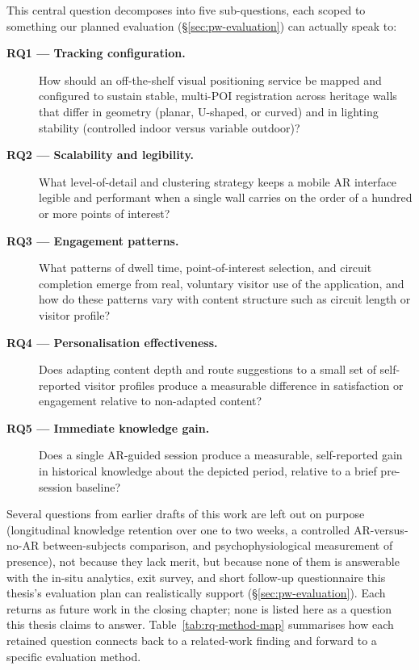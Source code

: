This central question decomposes into five sub-questions, each scoped to
something our planned evaluation (\S\ref{sec:pw-evaluation}) can actually
speak to:
 
\begin{description}
  \item[\textbf{RQ1 --- Tracking configuration.} ] How should an
  off-the-shelf visual positioning service be mapped and configured to
  sustain stable, multi-POI registration across heritage walls that differ
  in geometry (planar, U-shaped, or curved) and in lighting stability
  (controlled indoor versus variable outdoor)?
 
  \item[\textbf{RQ2 --- Scalability and legibility.}] What level-of-detail
  and clustering strategy keeps a mobile AR interface legible and
  performant when a single wall carries on the order of a hundred or more
  points of interest?
 
  \item[\textbf{RQ3 --- Engagement patterns.}] What patterns of dwell time,
  point-of-interest selection, and circuit completion emerge from real,
  voluntary visitor use of the application, and how do these patterns vary
  with content structure such as circuit length or visitor profile?
 
  \item[\textbf{RQ4 --- Personalisation effectiveness.}] Does adapting
  content depth and route suggestions to a small set of self-reported
  visitor profiles produce a measurable difference in satisfaction or
  engagement relative to non-adapted content?
 
  \item[\textbf{RQ5 --- Immediate knowledge gain.}] Does a single AR-guided
  session produce a measurable, self-reported gain in historical knowledge
  about the depicted period, relative to a brief pre-session baseline?
\end{description}
 
Several questions from earlier drafts of this work are left out on purpose
(longitudinal knowledge retention over one to two weeks, a controlled AR-versus-no-AR between-subjects comparison, and psychophysiological measurement of presence), not because they lack
merit, but because none of them is answerable with the in-situ analytics,
exit survey, and short follow-up questionnaire this thesis's evaluation
plan can realistically support (\S\ref{sec:pw-evaluation}). Each returns
as future work in the closing chapter; none is listed here
as a question this thesis claims to answer. Table~\ref{tab:rq-method-map}
summarises how each retained question connects back to a related-work
finding and forward to a specific evaluation method.
 
